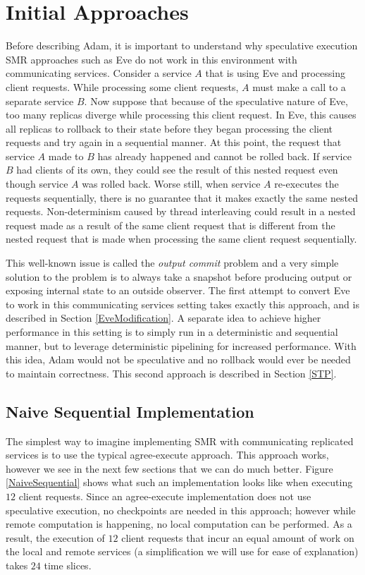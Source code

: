\documentclass[11pt, oneside]{report}
\begin{document}
\section{Initial Approaches}

Before describing Adam, it is important to understand why speculative execution SMR approaches such as Eve do not work in this environment with communicating services. 
Consider a service $A$ that is using Eve and processing client requests. 
While processing some client requests, $A$ must make a call to a separate service $B$. 
Now suppose that because of the speculative nature of Eve, too many replicas diverge while processing this client request. 
In Eve, this causes all replicas to rollback to their state before they began processing the client requests and try again in a sequential manner. 
At this point, the request that service $A$ made to $B$ has already happened and cannot be rolled back. 
If service $B$ had clients of its own, they could see the result of this nested request even though service $A$ was rolled back. 
Worse still, when service $A$ re-executes the requests sequentially, there is no guarantee that it makes exactly the same nested requests. 
Non-determinism caused by thread interleaving could result in a nested request made as a result of the same client request that is different from the nested request that is made when processing the same client request sequentially.

This well-known issue is called the \textit{output commit} problem \cite{mootaz} and a very simple solution to the problem is to always take a snapshot before producing output or exposing internal state to an outside observer. 
The first attempt to convert Eve to work in this communicating services setting takes exactly this approach, and is described in Section \ref{EveModification}. 
A separate idea to achieve higher performance in this setting is to simply run in a deterministic and sequential manner, but to leverage deterministic pipelining for increased performance. 
With this idea, Adam would not be speculative and no rollback would ever be needed to maintain correctness. 
This second approach is described in Section \ref{STP}.

\subsection{Naive Sequential Implementation}

The simplest way to imagine implementing SMR with communicating replicated services is to use the typical agree-execute approach.
This approach works, however we see in the next few sections that we can do much better. 
Figure \ref{NaiveSequential} shows what such an implementation looks like when executing $12$ client requests. 
Since an agree-execute implementation does not use speculative execution, no checkpoints are needed in this approach; however while remote computation is happening, no local computation can be performed.
As a result, the execution of $12$ client requests that incur an equal amount of work on the local and remote services (a simplification we will use for ease of explanation) takes $24$ time slices.
\end{document}

